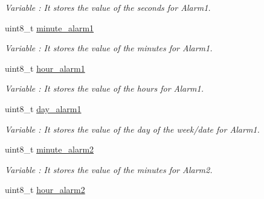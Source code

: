 \begin{DoxyCompactItemize}
\begin{DoxyCompactList}\small\item\em Variable \+: It stores the value of the seconds for Alarm1. \end{DoxyCompactList}\item 
uint8\+\_\+t \hyperlink{class_wasp_r_t_c_a9d6b69383ee943734df9e0d3068c2a04}{minute\+\_\+alarm1}\hypertarget{class_wasp_r_t_c_a9d6b69383ee943734df9e0d3068c2a04}{}\label{class_wasp_r_t_c_a9d6b69383ee943734df9e0d3068c2a04}

\begin{DoxyCompactList}\small\item\em Variable \+: It stores the value of the minutes for Alarm1. \end{DoxyCompactList}\item 
uint8\+\_\+t \hyperlink{class_wasp_r_t_c_a765adbeaf3e449783f9aef666f332308}{hour\+\_\+alarm1}\hypertarget{class_wasp_r_t_c_a765adbeaf3e449783f9aef666f332308}{}\label{class_wasp_r_t_c_a765adbeaf3e449783f9aef666f332308}

\begin{DoxyCompactList}\small\item\em Variable \+: It stores the value of the hours for Alarm1. \end{DoxyCompactList}\item 
uint8\+\_\+t \hyperlink{class_wasp_r_t_c_aa8f27ee3d427f966910c7598c95c380a}{day\+\_\+alarm1}\hypertarget{class_wasp_r_t_c_aa8f27ee3d427f966910c7598c95c380a}{}\label{class_wasp_r_t_c_aa8f27ee3d427f966910c7598c95c380a}

\begin{DoxyCompactList}\small\item\em Variable \+: It stores the value of the day of the week/date for Alarm1. \end{DoxyCompactList}\item 
uint8\+\_\+t \hyperlink{class_wasp_r_t_c_a2784b6a1898c1988b245fe683cb99396}{minute\+\_\+alarm2}\hypertarget{class_wasp_r_t_c_a2784b6a1898c1988b245fe683cb99396}{}\label{class_wasp_r_t_c_a2784b6a1898c1988b245fe683cb99396}

\begin{DoxyCompactList}\small\item\em Variable \+: It stores the value of the minutes for Alarm2. \end{DoxyCompactList}\item 
uint8\+\_\+t \hyperlink{class_wasp_r_t_c_a878fb26354144aa78851ba43e0e75fac}{hour\+\_\+alarm2}\hypertarget{class_wasp_r_t_c_a878fb26354144aa78851ba43e0e75fac}{}\label{class_wasp_r_t_c_a878fb26354144aa78851ba43e0e75fac}


\end{DoxyCompactItemize}
